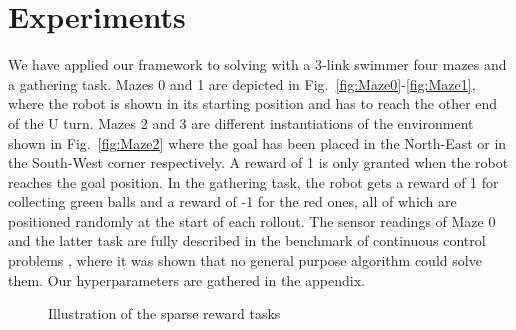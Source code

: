 \documentclass{article} %
\begin{document}
\section{Experiments}
We have applied our framework to solving with a 3-link swimmer four mazes and a gathering task. Mazes 0 and 1 are depicted in Fig.\ \ref{fig:Maze0}-\ref{fig:Maze1}, where the robot is shown in its starting position and has to reach the other end of the U turn. Mazes 2 and 3 are different instantiations of the environment shown in Fig.\ \ref{fig:Maze2} where the goal has been placed in the North-East or in the South-West corner respectively. A reward of 1 is only granted when the robot reaches the goal position. In the gathering task, the robot gets a reward of 1 for collecting green balls and a reward of -1 for the red ones, all of which are positioned randomly at the start of each rollout. The sensor readings of Maze 0 and the latter task are fully described in the benchmark of continuous control problems \citep{yuan2015rllab}, where it was shown that no general purpose algorithm could solve them. Our hyperparameters are gathered in the appendix.

\begin{figure}[h!]
	\centering
	\caption{Illustration of the sparse reward tasks}
	\label{fig:snn_multimodal_MI}
\end{figure}
\end{document}
